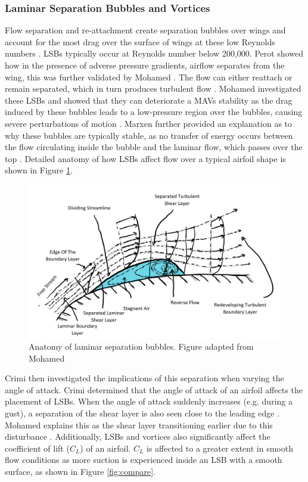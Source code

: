\subsubsection{Laminar Separation Bubbles and Vortices}
Flow separation and re-attachment create separation bubbles over wings and account for the most drag over the surface of wings at these low Reynolds numbers \cite{ravi}. LSBs typically occur at Reynolds number below 200,000. Perot showed how in the presence of adverse pressure gradients, airflow separates from the wing, this was further validated by Mohamed \cite{Mohamed2014} \cite{Perot1999}. The flow can either reattach or remain separated, which in turn produces turbulent flow \cite{stability}. Mohamed investigated these LSBs and showed that they can deteriorate a MAVs stability as the drag induced by these bubbles leads to a low-pressure region over the bubbles, causing severe perturbations of motion \cite{Mohamed2014}. Marxen further provided an explanation as to why these bubbles are typically stable, as no transfer of energy occurs between the flow circulating inside the bubble and the laminar flow, which passes over the top \cite{Marxen2010}. Detailed anatomy of how LSBs affect flow over a typical airfoil shape is shown in Figure \ref{fig:Laminar}.


\begin{figure}[H]
  \centering
   \includegraphics[width=\linewidth]{03_LiteratureReview/Figs/LSB.jpg}
  \caption{Anatomy of laminar separation bubbles. Figure adapted from Mohamed \cite{Mohamed2014}}
  \label{fig:Laminar}
\end{figure}

Crimi then investigated the implications of this separation when varying the angle of attack. Crimi determined that the angle of attack of an airfoil affects the placement of LSBs. When the angle of attack suddenly increases (e.g. during a gust), a separation of the shear layer is also seen close to the leading edge \cite{Crimi1976}. Mohamed explains this as the shear layer transitioning earlier due to this disturbance  \cite{Mohamed2014}. Additionally, LSBs and vortices also significantly affect the coefficient of lift ($C_L$) of an airfoil. $C_L$ is affected to a greater extent in smooth flow conditions as more suction is experienced inside an LSB with a smooth surface, as shown in Figure \ref{fig:compare}. 


